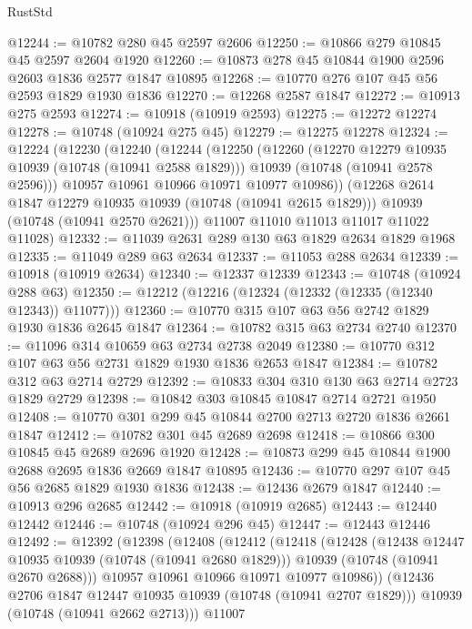\begin{lexlean}{RustStd}
\begin{coremodule}
@12244 := @10782 @280 @45 @2597 @2606
@12250 := @10866 @279 @10845 @45 @2597 @2604 @1920
@12260 := @10873 @278 @45 @10844 @1900 @2596 @2603 @1836 @2577 @1847 @10895
@12268 := @10770 @276 @107 @45 @56 @2593 @1829 @1930 @1836
@12270 := @12268 @2587 @1847
@12272 := @10913 @275 @2593
@12274 := @10918 (@10919 @2593)
@12275 := @12272 @12274
@12278 := @10748 (@10924 @275 @45)
@12279 := @12275 @12278
@12324 := @12224
    (@12230
      (@12240
        (@12244
          (@12250
            (@12260
              (@12270 @12279 @10935 @10939 (@10748 (@10941 @2588 @1829)))
              @10939
              (@10748 (@10941 @2578 @2596)))
            @10957
            @10961
            @10966
            @10971
            @10977
            @10986))
        (@12268 @2614 @1847 @12279 @10935 @10939 (@10748 (@10941 @2615 @1829)))
        @10939
        (@10748 (@10941 @2570 @2621)))
      @11007
      @11010
      @11013
      @11017
      @11022
      @11028)
@12332 := @11039 @2631 @289 @130 @63 @1829 @2634 @1829 @1968
@12335 := @11049 @289 @63 @2634
@12337 := @11053 @288 @2634
@12339 := @10918 (@10919 @2634)
@12340 := @12337 @12339
@12343 := @10748 (@10924 @288 @63)
@12350 := @12212 (@12216 (@12324 (@12332 (@12335 (@12340 @12343)) @11077)))
@12360 := @10770 @315 @107 @63 @56 @2742 @1829 @1930 @1836 @2645 @1847
@12364 := @10782 @315 @63 @2734 @2740
@12370 := @11096 @314 @10659 @63 @2734 @2738 @2049
@12380 := @10770 @312 @107 @63 @56 @2731 @1829 @1930 @1836 @2653 @1847
@12384 := @10782 @312 @63 @2714 @2729
@12392 := @10833 @304 @310 @130 @63 @2714 @2723 @1829 @2729
@12398 := @10842 @303 @10845 @10847 @2714 @2721 @1950
@12408 := @10770 @301 @299 @45 @10844 @2700 @2713 @2720 @1836 @2661 @1847
@12412 := @10782 @301 @45 @2689 @2698
@12418 := @10866 @300 @10845 @45 @2689 @2696 @1920
@12428 := @10873 @299 @45 @10844 @1900 @2688 @2695 @1836 @2669 @1847 @10895
@12436 := @10770 @297 @107 @45 @56 @2685 @1829 @1930 @1836
@12438 := @12436 @2679 @1847
@12440 := @10913 @296 @2685
@12442 := @10918 (@10919 @2685)
@12443 := @12440 @12442
@12446 := @10748 (@10924 @296 @45)
@12447 := @12443 @12446
@12492 := @12392
    (@12398
      (@12408
        (@12412
          (@12418
            (@12428
              (@12438 @12447 @10935 @10939 (@10748 (@10941 @2680 @1829)))
              @10939
              (@10748 (@10941 @2670 @2688)))
            @10957
            @10961
            @10966
            @10971
            @10977
            @10986))
        (@12436 @2706 @1847 @12447 @10935 @10939 (@10748 (@10941 @2707 @1829)))
        @10939
        (@10748 (@10941 @2662 @2713)))
      @11007

\end{coremodule}
\end{lexlean}
